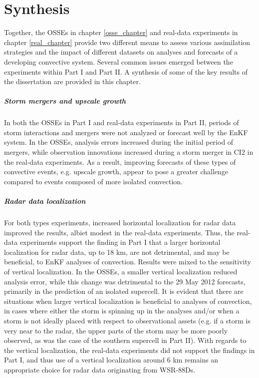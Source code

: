 \chapter{Synthesis}

Together, the OSSEs in chapter \ref{osse_chapter} and real-data experiments in chapter \ref{real_chapter} provide two different means to assess various assimilation strategies and the impact of different datasets on analyses and forecasts of a developing convective system. Several common issues emerged between the experiments within Part I and Part II. A synthesis of some of the key results of the dissertation are provided in this chapter.

\paragraph{Storm mergers and upscale growth}
In both the OSSEs in Part I and real-data experiments in Part II, periods of storm interactions and mergers were not analyzed or forecast well by the EnKF system. In the OSSEs, analysis errors increased during the initial period of mergers, while observation innovations increased during a storm merger in CI2 in the real-data experiments. As a result, improving forecasts of these types of convective events, e.g. upscale growth, appear to pose a greater challenge compared to events composed of more isolated convection.

\paragraph{Radar data localization}
For both types experiments, increased horizontal localization for radar data improved the results, albiet modest in the real-data experiments. Thus, the real-data experiments support the finding in Part I that a larger horizontal localization for radar data, up to 18 km, are not detrimental, and may be beneficial, to EnKF analyses of convection. Results were mixed to the sensitivity of vertical localization. In the OSSEs, a smaller vertical localization reduced analysis error, while this change was detrimental to the 29 May 2012 forecasts, primarily in the prediction of an isolated supercell. It is evident that there are situations when larger vertical localization is beneficial to analyses of convection, in cases where either the storm is spinning up in the analyses and/or when a storm is not ideally placed with respect to observational assets (e.g. if a storm is very near to the radar, the upper parts of the storm may be more poorly observed, as was the case of the southern supercell in Part II). With regards to the vertical localization, the real-data experiments did not support the findings in Part I, and thus use of a vertical localization around 6 km remains an appropriate choice for radar data originating from WSR-88Ds.

